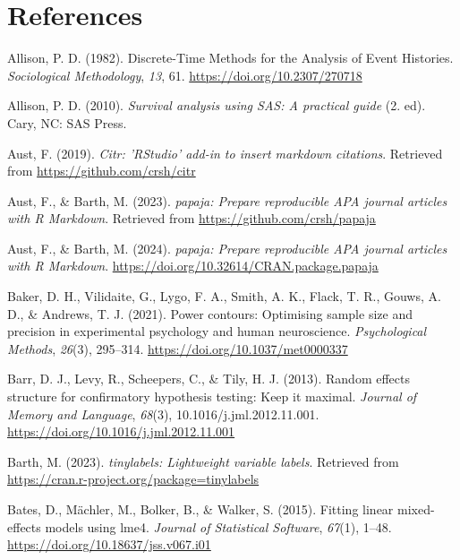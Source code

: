 \documentclass[
  man, donotrepeattitle,floatsintext]{apa6}
\newlength{\cslhangindent}
\newenvironment{CSLReferences}[2] %
 {\begin{list}{}{%
  \setlength{\itemindent}{0pt}
  \setlength{\leftmargin}{0pt}
  \setlength{\parsep}{0pt}
  \ifodd #1
   \setlength{\leftmargin}{\cslhangindent}
   \setlength{\itemindent}{-1\cslhangindent}
  \fi
  \setlength{\itemsep}{#2\baselineskip}}}
 {\end{list}}
\begin{document}
\section{References}\label{references}

\label{refs}
\begin{CSLReferences}{1}{0}
Allison, P. D. (1982). Discrete-{Time Methods} for the {Analysis} of {Event Histories}. \emph{Sociological Methodology}, \emph{13}, 61. \url{https://doi.org/10.2307/270718}

Allison, P. D. (2010). \emph{Survival analysis using {SAS}: A practical guide} (2. ed). Cary, NC: SAS Press.

Aust, F. (2019). \emph{Citr: 'RStudio' add-in to insert markdown citations}. Retrieved from \url{https://github.com/crsh/citr}

Aust, F., \& Barth, M. (2023). \emph{{papaja}: {Prepare} reproducible {APA} journal articles with {R Markdown}}. Retrieved from \url{https://github.com/crsh/papaja}

Aust, F., \& Barth, M. (2024). \emph{{papaja}: {Prepare} reproducible {APA} journal articles with {R Markdown}}. \url{https://doi.org/10.32614/CRAN.package.papaja}

Baker, D. H., Vilidaite, G., Lygo, F. A., Smith, A. K., Flack, T. R., Gouws, A. D., \& Andrews, T. J. (2021). Power contours: {Optimising} sample size and precision in experimental psychology and human neuroscience. \emph{Psychological Methods}, \emph{26}(3), 295--314. \url{https://doi.org/10.1037/met0000337}

Barr, D. J., Levy, R., Scheepers, C., \& Tily, H. J. (2013). Random effects structure for confirmatory hypothesis testing: {Keep} it maximal. \emph{Journal of Memory and Language}, \emph{68}(3), 10.1016/j.jml.2012.11.001. \url{https://doi.org/10.1016/j.jml.2012.11.001}

Barth, M. (2023). \emph{{tinylabels}: Lightweight variable labels}. Retrieved from \url{https://cran.r-project.org/package=tinylabels}

Bates, D., Mächler, M., Bolker, B., \& Walker, S. (2015). Fitting linear mixed-effects models using {lme4}. \emph{Journal of Statistical Software}, \emph{67}(1), 1--48. \url{https://doi.org/10.18637/jss.v067.i01}


\end{CSLReferences}
\end{document}
